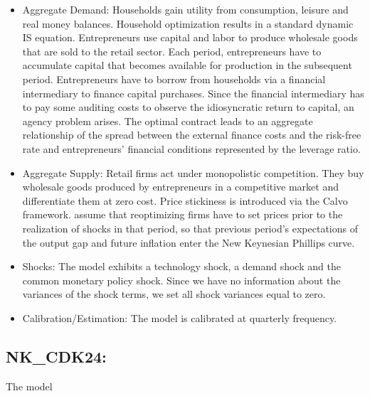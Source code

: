 \documentclass[11pt,a4paper]{article}
\begin{document}
	\begin{itemize}
		
		\item Aggregate Demand: Households gain utility from consumption, leisure and real money balances. Household optimization results in a standard dynamic IS equation. Entrepreneurs use capital and labor to produce wholesale goods that are sold to the retail sector. Each period, entrepreneurs have to accumulate capital that becomes available for production in the subsequent period. Entrepreneurs have to borrow from households via a financial intermediary to finance capital purchases. Since the financial intermediary has to pay some auditing costs to observe the idiosyncratic return to capital, an agency problem arises. The optimal contract leads to an aggregate relationship of the spread between the external finance costs and the risk-free rate and entrepreneurs' financial conditions represented by the leverage ratio.
		
		\item Aggregate Supply: Retail firms act under monopolistic competition. They buy wholesale goods produced by entrepreneurs in a competitive market and differentiate them at zero cost. Price stickiness is introduced via the Calvo framework. \cite{BernankeGertlerGilchrist1999} assume that reoptimizing firms have to set prices prior to the realization of shocks in that period, so that previous period's expectations of the output gap and future inflation enter the New Keynesian Phillips curve.
		
		\item Shocks: The model exhibits a technology shock, a demand shock and the common monetary policy shock. Since we have no information about the variances of the shock terms, we set all shock variances equal to zero.
		
		\item Calibration/Estimation: The model is calibrated at quarterly frequency.
		
		
	\end{itemize}
	
	
	\subsection{NK\_CDK24: \texorpdfstring{\cite{chan2024energy}}{Chan et al. (2024)}}
	\label{NKCDK24}
	
	The model
	
\end{document}
